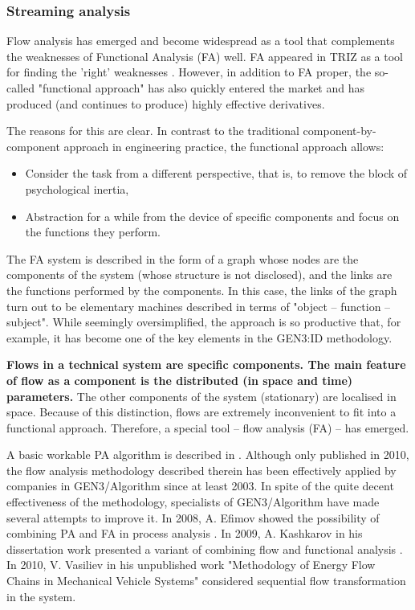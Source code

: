 \documentclass[a4paper,11pt]{article}
\begin{document}
\subsubsection*{Streaming analysis}

Flow analysis has emerged and become widespread as a tool that complements the
weaknesses of Functional Analysis (FA) well. FA appeared in TRIZ as a tool for
finding the 'right' weaknesses \cite{B7,B8}. However, in addition to FA
proper, the so-called "functional approach" has also quickly entered the
market and has produced (and continues to produce) highly effective
derivatives.

The reasons for this are clear. In contrast to the traditional
component-by-component approach in engineering practice, the functional
approach allows:
\begin{itemize}
\item Consider the task from a different perspective, that is, to remove the
  block of psychological inertia,
\item Abstraction for a while from the device of specific components and focus
  on the functions they perform.
\end{itemize}
The FA system is described in the form of a graph whose nodes are the
components of the system (whose structure is not disclosed), and the links are
the functions performed by the components. In this case, the links of the
graph turn out to be elementary machines described in terms of "object --
function -- subject". While seemingly oversimplified, the approach is so
productive that, for example, it has become one of the key elements in the
GEN3:ID methodology.

\textbf{Flows in a technical system are specific components. The main feature
  of flow as a component is the distributed (in space and time) parameters.}
The other components of the system (stationary) are localised in space.
Because of this distinction, flows are extremely inconvenient to fit into a
functional approach. Therefore, a special tool -- flow analysis (FA) -- has
emerged.

A basic workable PA algorithm is described in \cite{B9}. Although only
published in 2010, the flow analysis methodology described therein has been
effectively applied by companies in GEN3/Algorithm since at least 2003. In
spite of the quite decent effectiveness of the methodology, specialists of
GEN3/Algorithm have made several attempts to improve it. In 2008, A. Efimov
showed the possibility of combining PA and FA in process analysis
\cite{B10}. In 2009, A. Kashkarov in his dissertation work presented a variant
of combining flow and functional analysis \cite{B11}. In 2010, V. Vasiliev in
his unpublished work "Methodology of Energy Flow Chains in Mechanical Vehicle
Systems" considered sequential flow transformation in the system.
\end{document}

